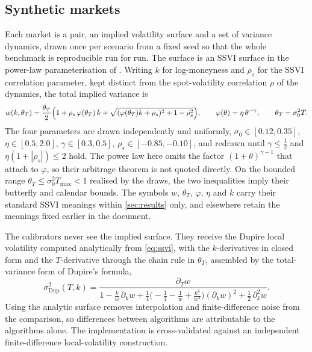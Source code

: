\documentclass[11pt,a4paper]{article}
\theoremstyle{plain}
\theoremstyle{definition}
\theoremstyle{definition}
\newcommand{\abs}[1]{\left\lvert #1 \right\rvert}
\newcommand{\sigDup}{\sigma_{\mathrm{Dup}}}
\begin{document}
\subsection{Synthetic markets}\label{subsec:synthmarkets}

Each market is a pair, an implied volatility surface and a set of variance dynamics, drawn once per scenario from a fixed seed so that the whole benchmark is reproducible run for run. The surface is an SSVI surface in the power-law parameterisation of \citet{gatheral2014}. Writing $k$ for log-moneyness and $\rho_s$ for the SSVI correlation parameter, kept distinct from the spot-volatility correlation $\rho$ of the dynamics, the total implied variance is
\begin{equation}\label{eq:ssvi}
  w(k, \theta_T) = \frac{\theta_T}{2}\Bigl( 1 + \rho_s\,\varphi(\theta_T)\,k + \sqrt{(\varphi(\theta_T)k + \rho_s)^2 + 1 - \rho_s^2} \Bigr),
  \qquad \varphi(\theta) = \eta\,\theta^{-\gamma},
  \qquad \theta_T = \sigma_0^2 T .
\end{equation}
The four parameters are drawn independently and uniformly, $\sigma_0 \in [0.12, 0.35]$, $\eta \in [0.5, 2.0]$, $\gamma \in [0.3, 0.5]$, $\rho_s \in [-0.85, -0.10]$, and redrawn until $\gamma \leq \tfrac12$ and $\eta(1 + \abs{\rho_s}) \leq 2$ hold. The power law here omits the factor $(1+\theta)^{\gamma-1}$ that \citet{gatheral2014} attach to $\varphi$, so their arbitrage theorem is not quoted directly. On the bounded range $\theta_T \leq \sigma_0^2 T_{\max} < 1$ realised by the draws, the two inequalities imply their butterfly and calendar bounds. The symbols $w$, $\theta_T$, $\varphi$, $\eta$ and $k$ carry their standard SSVI meanings within \cref{sec:results} only, and elsewhere retain the meanings fixed earlier in the document.

The calibrators never see the implied surface. They receive the Dupire local volatility computed analytically from \cref{eq:ssvi}, with the $k$-derivatives in closed form and the $T$-derivative through the chain rule in $\theta_T$, assembled by the total-variance form of Dupire's formula,
\begin{equation}\label{eq:dupiretv}
  \sigDup^2(T, k)
  = \frac{\partial_T w}{1 - \frac{k}{w}\,\partial_k w + \frac14\bigl(-\frac14 - \frac1w + \frac{k^2}{w^2}\bigr)(\partial_k w)^2 + \frac12\,\partial_k^2 w} .
\end{equation}
Using the analytic surface removes interpolation and finite-difference noise from the comparison, so differences between algorithms are attributable to the algorithms alone. The implementation is cross-validated against an independent finite-difference local-volatility construction.
\end{document}
